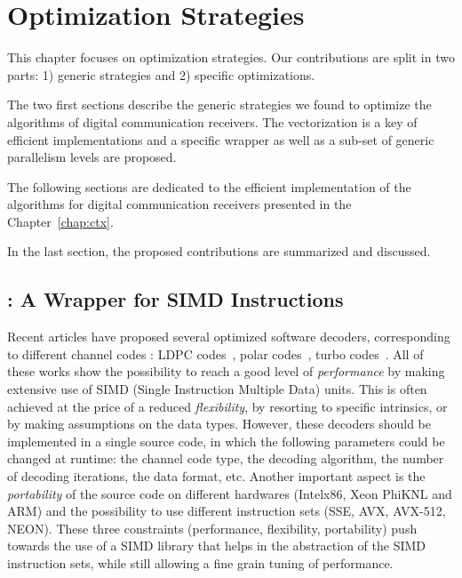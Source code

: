 
\renewcommand{\curChapter}{main/chapter2}

\chapter{Optimization Strategies}
\label{chap:opt}

This chapter focuses on optimization strategies. Our contributions are split in
two parts: 1) generic strategies and 2) specific optimizations.

The two first sections describe the generic strategies we found to optimize
the algorithms of digital communication receivers. The vectorization is a
key of efficient implementations and a specific wrapper as well as a sub-set of
generic parallelism levels are proposed.

The following sections are dedicated to the efficient implementation of the
algorithms for digital communication receivers presented in the
Chapter~\ref{chap:ctx}.

In the last section, the proposed contributions are summarized and discussed.

\vspace*{\fill}
\minitoccustom
\vspace*{\fill}

\newpage
\section{\MIPP: A \Cxx Wrapper for SIMD Instructions}
\label{sec:opt_mipp}

Recent articles have proposed several optimized software decoders, corresponding
to different channel codes : LDPC codes~\cite{LeGal2015,LeGal2016,LeGal2017a},
polar codes~\cite{Giard2016b,Sarkis2016,Cassagne2015c,Cassagne2016b,
Leonardon2019}, turbo codes~\cite{Zhang2012,Wu2013,Cassagne2016a,LeGal2019a}.
All of these works show the possibility to reach a good level of
\textit{performance} by making extensive use of SIMD (Single Instruction
Multiple Data) units. This is often achieved at the price of a reduced
\textit{flexibility}, by resorting to specific intrinsics, or by making
assumptions on the data types. However, these decoders should be implemented in
a single source code, in which the following parameters could be changed at
runtime: the channel code type, the decoding algorithm, the number of decoding
iterations, the data format, etc. Another important aspect is the
\textit{portability} of the source code on different hardwares (Intel\R x86,
Xeon Phi\TM KNL and ARM\R) and the possibility to use different instruction sets
(SSE, AVX, AVX-512, NEON). These three constraints (performance, flexibility,
portability) push towards the use of a SIMD library that helps in the
abstraction of the SIMD instruction sets, while still allowing a fine grain
tuning of performance.

